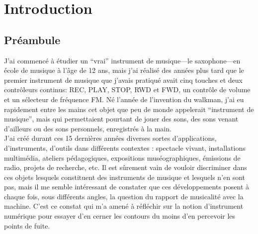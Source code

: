 %
\chapter{Introduction}
\label{ch:introduction}
%


\section{Préambule}


J'ai commencé à étudier un ``vrai'' instrument de musique—le saxophone—en école de musique à l'âge de 12 ans, mais j'ai réalisé des années plus tard que le premier instrument de musique que j'avais pratiqué avait cinq touches et deux contrôleurs continus: REC, PLAY, STOP, RWD et FWD, un contrôle de volume et un sélecteur de fréquence FM. Né l'année de l'invention du walkman, j'ai eu rapidement entre les mains cet objet que peu de monde appelerait ``instrument de musique'', mais qui permettaient pourtant de jouer des sons, des sons venant d'ailleurs ou des sons personnels, enregistrés à la main.\\
J'ai créé durant ces 15 dernières années diverses sortes d'applications, d'instruments, d'outils dans différents contextes : spectacle vivant, installations multimédia, ateliers pédagogiques, expositions muséographiques, émissions de radio, projets de recherche, etc. Il est sûrement vain de vouloir discriminer dans ces objets lesquels constituent des instruments de musique et lesquels n'en sont pas, mais il me semble intéressant de constater que ces développements posent à chaque fois, sous différents angles, la question du rapport de musicalité avec la machine.
C'est ce constat qui m'a amené à réfléchir sur la notion d'instrument numérique pour essayer d'en cerner les contours du moins d'en percevoir les points de fuite.


